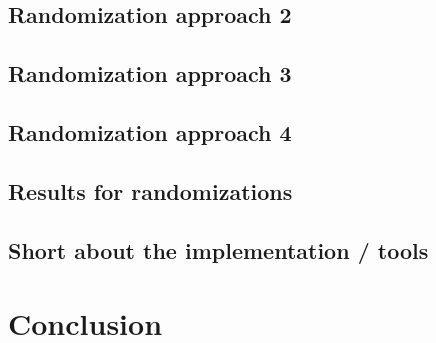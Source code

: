 \documentclass[a4paper,10pt]{article}
\begin{document}
\subsection{Randomization approach 2}

\subsection{Randomization approach 3}

\subsection{Randomization approach 4}

\subsection{Results for randomizations}

\subsection{Short about the implementation / tools}

\newpage
\section{Conclusion}
\end{document}
